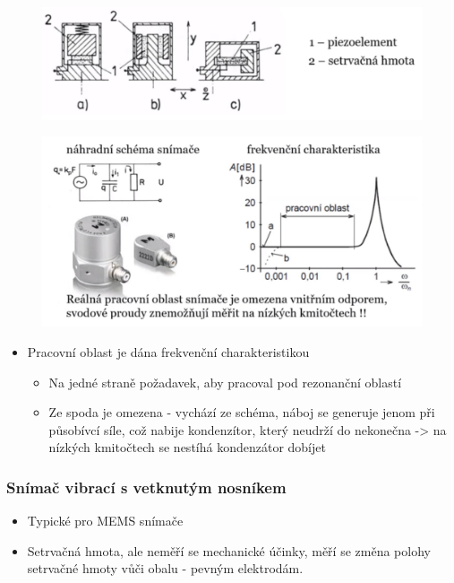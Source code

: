 \begin{figure}[h]
    \centering
    \includegraphics[scale = 0.40]{img/piezoVIB.png}
\end{figure}

\begin{figure}[h]
    \centering
    \includegraphics[scale = 0.50]{img/piezoVIB1.png}
\end{figure}

\begin{itemize}
    \item Pracovní oblast je dána frekvenční charakteristikou \begin{itemize}
        \item Na jedné straně požadavek, aby pracoval pod rezonanční oblastí
        \item Ze spoda je omezena - vychází ze schéma, náboj se generuje jenom při působívcí síle, což nabije kondenzítor, který neudrží do nekonečna -> na nízkých kmitočtech se nestíhá kondenzátor dobíjet
    \end{itemize}
\end{itemize}

\subsubsection*{Snímač vibrací s vetknutým nosníkem}
\begin{itemize}
    \item Typické pro MEMS snímače
    \item Setrvačná hmota, ale neměří se mechanické účinky, měří se změna polohy setrvačné hmoty vůči obalu - pevným elektrodám.
\end{itemize}

